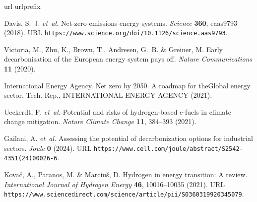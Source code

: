 \documentclass[5p,numafflabel]{elsarticle}
\begin{document}
\renewcommand{\ttdefault}{\sfdefault}
\begin{thebibliography}{10}
\expandafter\ifx\csname url\endcsname\relax
  \def\url#1{\texttt{#1}}\fi
\expandafter\ifx\csname urlprefix\endcsname\relax\def\urlprefix{URL }\fi
\providecommand{\bibinfo}[2]{#2}
\providecommand{\eprint}[2][]{\url{#2}}

\bibinfo{author}{Davis, S.~J.} \emph{et~al.}
\newblock \bibinfo{title}{Net-zero emissions energy systems}.
\newblock \emph{\bibinfo{journal}{Science}} \textbf{\bibinfo{volume}{360}},
  \bibinfo{pages}{eaas9793} (\bibinfo{year}{2018}).
\newblock \urlprefix\url{https://www.science.org/doi/10.1126/science.aas9793}.

\bibinfo{author}{Victoria, M.}, \bibinfo{author}{Zhu, K.},
  \bibinfo{author}{Brown, T.}, \bibinfo{author}{Andresen, G.~B.} \&
  \bibinfo{author}{Greiner, M.}
\newblock \bibinfo{title}{Early decarbonisation of the {{European}} energy
  system pays off}.
\newblock \emph{\bibinfo{journal}{Nature Communications}}
  \textbf{\bibinfo{volume}{11}} (\bibinfo{year}{2020}).

\bibinfo{author}{{International Energy Agency}}.
\newblock \bibinfo{title}{Net zero by 2050. {{A}} roadmap for {{theGlobal}}
  energy sector}.
\newblock \bibinfo{type}{Tech. Rep.}, \bibinfo{institution}{INTERNATIONAL
  ENERGY AGENCY} (\bibinfo{year}{2021}).

\bibinfo{author}{Ueckerdt, F.} \emph{et~al.}
\newblock \bibinfo{title}{Potential and risks of hydrogen-based e-fuels in
  climate change mitigation}.
\newblock \emph{\bibinfo{journal}{Nature Climate Change}}
  \textbf{\bibinfo{volume}{11}}, \bibinfo{pages}{384--393}
  (\bibinfo{year}{2021}).

\bibinfo{author}{Gailani, A.} \emph{et~al.}
\newblock \bibinfo{title}{Assessing the potential of decarbonization options
  for industrial sectors}.
\newblock \emph{\bibinfo{journal}{Joule}} \textbf{\bibinfo{volume}{0}}
  (\bibinfo{year}{2024}).
\newblock
  \urlprefix\url{https://www.cell.com/joule/abstract/S2542-4351(24)00026-6}.

\bibinfo{author}{Kova{\v c}, A.}, \bibinfo{author}{Paranos, M.} \&
  \bibinfo{author}{Marciu{\v s}, D.}
\newblock \bibinfo{title}{Hydrogen in energy transition: {{A}} review}.
\newblock \emph{\bibinfo{journal}{International Journal of Hydrogen Energy}}
  \textbf{\bibinfo{volume}{46}}, \bibinfo{pages}{10016--10035}
  (\bibinfo{year}{2021}).
\newblock
  \urlprefix\url{https://www.sciencedirect.com/science/article/pii/S0360319920345079}.


\end{thebibliography}
\end{document}
